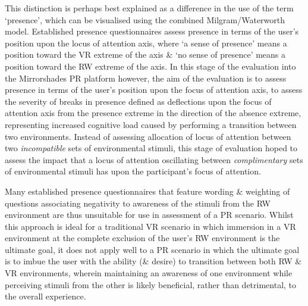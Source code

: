 This distinction is perhaps best explained as a difference in the use of the term `presence', which can be visualised using the combined Milgram/Waterworth model. Established presence questionnaires assess presence in terms of the user's position upon the locus of attention axis, where `a sense of presence' means a position toward the VR extreme of the axis \& `no sense of presence' means a position toward the RW extreme of the axis. In this stage of the evaluation into the Mirrorshades PR platform however, the aim of the evaluation is to assess presence in terms of the user's position upon the focus of attention axis, to assess the severity of breaks in presence defined as deflections upon the focus of attention axis from the presence extreme in the direction of the absence extreme, representing increased cognitive load caused by performing a transition between two environments. Instead of assessing allocation of locus of attention between two \textit{incompatible} sets of environmental stimuli, this stage of evaluation hoped to assess the impact that a locus of attention oscillating between \textit{complimentary} sets of environmental stimuli has upon the participant's focus of attention.

Many established presence questionnaires that feature wording \& weighting of questions associating negativity to awareness of the stimuli from the RW environment are thus unsuitable for use in assessment of a PR scenario. Whilst this approach is ideal for a traditional VR scenario in which immersion in a VR environment at the complete exclusion of the user's RW environment is the ultimate goal, it does not apply well to a PR scenario in which the ultimate goal is to imbue the user with the ability (\& desire) to transition between both RW \& VR environments, wherein maintaining an awareness of one environment while perceiving stimuli from the other is likely beneficial, rather than detrimental, to the overall experience.

